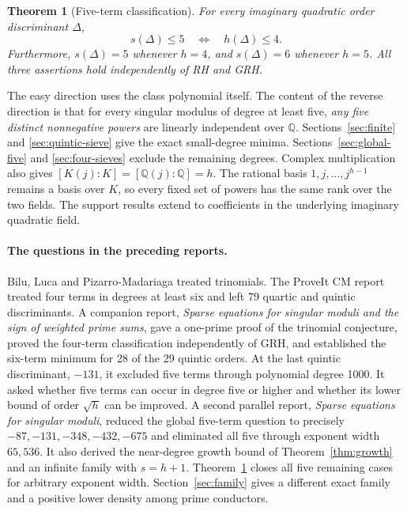 \documentclass[11pt]{article}
\newtheorem{theorem}{Theorem}[section]
\newcommand{\Q}{\mathbb Q}\newcommand{\Z}{\mathbb Z}\newcommand{\F}{\mathbb F}
\begin{document}
\begin{theorem}[Five-term classification]\label{thm:four}
For every imaginary quadratic order discriminant $\Delta$,
\[
       s(\Delta)\le5\quad\Longleftrightarrow\quad h(\Delta)\le4.
\]
Furthermore, $s(\Delta)=5$ whenever $h=4$, and $s(\Delta)=6$ whenever $h=5$. All three assertions hold independently of RH and GRH.
\end{theorem}
The easy direction uses the class polynomial itself. The content of the reverse direction is that for every singular modulus of degree at least five, \emph{any five distinct nonnegative powers} are linearly independent over $\Q$. Sections~\ref{sec:finite} and \ref{sec:quintic-sieve} give the exact small-degree minima. Sections~\ref{sec:global-five} and \ref{sec:four-sieves} exclude the remaining degrees. Complex multiplication also gives $[K(j):K]=[\Q(j):\Q]=h$. The rational basis $1,j,\ldots,j^{h-1}$ remains a basis over $K$, so every fixed set of powers has the same rank over the two fields. The support results extend to coefficients in the underlying imaginary quadratic field.

\paragraph{The questions in the preceding reports.}
Bilu, Luca and Pizarro-Madariaga treated trinomials. The ProveIt CM report treated four terms in degrees at least six and left 79 quartic and quintic discriminants. A companion report, \emph{Sparse equations for singular moduli and the sign of weighted prime sums}, gave a one-prime proof of the trinomial conjecture, proved the four-term classification independently of GRH, and established the six-term minimum for 28 of the 29 quintic orders. At the last quintic discriminant, $-131$, it excluded five terms through polynomial degree 1000. It asked whether five terms can occur in degree five or higher and whether its lower bound of order $\sqrt h$ can be improved. A second parallel report, \emph{Sparse equations for singular moduli}, reduced the global five-term question to precisely $-87,-131,-348,-432,-675$ and eliminated all five through exponent width $65{,}536$. It also derived the near-degree growth bound of Theorem~\ref{thm:growth} and an infinite family with $s=h+1$. Theorem~\ref{thm:four} closes all five remaining cases for arbitrary exponent width. Section~\ref{sec:family} gives a different exact family and a positive lower density among prime conductors.\cite{riffaut,prior,companion,sparseparallel}
\end{document}
